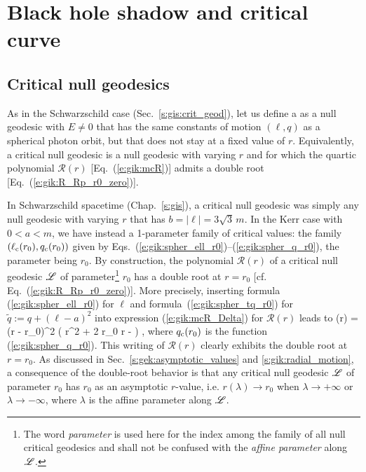
\section{Black hole shadow and critical curve} \label{s:gik:shadow}

\subsection{Critical null geodesics} \label{s:gik:critical_geod}

As in the Schwarzschild case (Sec.~\ref{s:gis:crit_geod}), let us define
a 
as a null geodesic with $E\neq 0$ that has the same constants of motion
$(\ell,q)$ as a spherical photon orbit, but that does not stay at a fixed value
of $r$. Equivalently, a critical null geodesic
is a null geodesic with varying $r$ and for which the quartic polynomial $\mathcal{R}(r)$
[Eq.~(\ref{e:gik:mcR})] admits a double root [Eq.~(\ref{e:gik:R_Rp_r0_zero})].

In Schwarzschild spacetime (Chap.~\ref{s:gis}),
a critical null geodesic was simply any null geodesic with varying $r$
that has $b = |\ell| = 3\sqrt{3}\, m$.
In the Kerr case with $0 < a < m$, we have instead a 1-parameter family of critical values:
the family $(\ell_{\rm c}(r_0),q_{\rm c}(r_0))$ given by Eqs.~(\ref{e:gik:spher_ell_r0})--(\ref{e:gik:spher_q_r0}), the
parameter being $r_0$. By construction, the polynomial $\mathcal{R}(r)$
of a critical null geodesic $\mathscr{L}$ of parameter\footnote{The word \emph{parameter} is
used here for the index among the family of all null critical geodesics and shall
not be confused with the \emph{affine parameter} along $\mathscr{L}$.} $r_0$ has a double root at $r=r_0$
[cf. Eq.~(\ref{e:gik:R_Rp_r0_zero})]. More precisely, inserting formula
(\ref{e:gik:spher_ell_r0}) for $\ell$ and formula~(\ref{e:gik:spher_tq_r0})
for $\tilde{q} := q + (\ell - a)^2$
into expression (\ref{e:gik:mcR_Delta}) for $\mathcal{R}(r)$ leads to
\be \label{e:gik:mR_critical_null}
    (r) = (r - r_0)^2 \left( r^2 + 2 r_0 r -  \right) ,
\ee
where $q_{\rm c}(r_0)$ is the function (\ref{e:gik:spher_q_r0}).
This writing of $\mathcal{R}(r)$ clearly exhibits the double root at $r=r_0$.
As discussed in Sec.~\ref{s:gek:asymptotic_values} and \ref{s:gik:radial_motion},
a consequence of the double-root behavior is that
any critical null geodesic $\mathscr{L}$ of parameter $r_0$ has
$r_0$ as an asymptotic $r$-value, i.e. $r(\lambda)\to r_0$
when $\lambda\to+\infty$ or $\lambda\to-\infty$, where $\lambda$ is the affine
parameter along $\mathscr{L}$.

